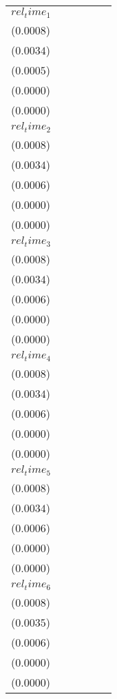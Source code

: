 \begin{tabular}{llllll}
$rel_time_1$        &   \makecell{$0.0016^{**}$ \\ ($0.0008$)} &    \makecell{$0.0062^{*}$ \\ ($0.0034$)} &  \makecell{$0.0045^{***}$ \\ ($0.0005$)} &  \makecell{$0.0003^{***}$ \\ ($0.0000$)} &  \makecell{$0.0001^{***}$ \\ ($0.0000$)} \\
$rel_time_2$        &  \makecell{$0.0022^{***}$ \\ ($0.0008$)} &   \makecell{$0.0081^{**}$ \\ ($0.0034$)} &  \makecell{$0.0038^{***}$ \\ ($0.0006$)} &  \makecell{$0.0003^{***}$ \\ ($0.0000$)} &  \makecell{$0.0001^{***}$ \\ ($0.0000$)} \\
$rel_time_3$        &  \makecell{$0.0028^{***}$ \\ ($0.0008$)} &  \makecell{$0.0106^{***}$ \\ ($0.0034$)} &  \makecell{$0.0033^{***}$ \\ ($0.0006$)} &  \makecell{$0.0003^{***}$ \\ ($0.0000$)} &  \makecell{$0.0001^{***}$ \\ ($0.0000$)} \\
$rel_time_4$        &   \makecell{$0.0018^{**}$ \\ ($0.0008$)} &    \makecell{$0.0062^{*}$ \\ ($0.0034$)} &  \makecell{$0.0031^{***}$ \\ ($0.0006$)} &  \makecell{$0.0002^{***}$ \\ ($0.0000$)} &  \makecell{$0.0001^{***}$ \\ ($0.0000$)} \\
$rel_time_5$        &  \makecell{$0.0022^{***}$ \\ ($0.0008$)} &   \makecell{$0.0077^{**}$ \\ ($0.0034$)} &  \makecell{$0.0029^{***}$ \\ ($0.0006$)} &  \makecell{$0.0002^{***}$ \\ ($0.0000$)} &     \makecell{$0.0000^{}$ \\ ($0.0000$)} \\
$rel_time_6$        &  \makecell{$0.0024^{***}$ \\ ($0.0008$)} &  \makecell{$0.0094^{***}$ \\ ($0.0035$)} &  \makecell{$0.0019^{***}$ \\ ($0.0006$)} &  \makecell{$0.0001^{***}$ \\ ($0.0000$)} &     \makecell{$0.0000^{}$ \\ ($0.0000$)} \\

\end{tabular}
